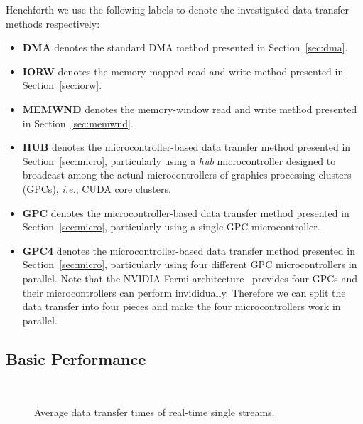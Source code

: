 Henchforth we use the following labels to denote the investigated data
transfer methods respectively:
\begin{itemize}
 \item \textbf{DMA} denotes the standard DMA method presented in
       Section~\ref{sec:dma}.
 \item \textbf{IORW} denotes the memory-mapped read and write method
       presented in Section~\ref{sec:iorw}.
 \item \textbf{MEMWND} denotes the memory-window read and write method
       presented in Section~\ref{sec:memwnd}.
 \item \textbf{HUB} denotes the microcontroller-based data transfer
       method presented in Section~\ref{sec:micro}, particularly using a
       \textit{hub} microcontroller designed to broadcast among the
       actual microcontrollers of graphics processing clusters (GPCs),
       \textit{i.e.}, CUDA core clusters.
 \item \textbf{GPC} denotes the microcontroller-based data transfer
       method presented in Section~\ref{sec:micro}, particularly using a
       single GPC microcontroller.
 \item \textbf{GPC4} denotes the microcontroller-based data transfer
       method presented in Section~\ref{sec:micro}, particularly using
       four different GPC microcontrollers in parallel.
       Note that the NVIDIA Fermi architecture~\cite{NVIDIA_Fermi}
       provides four GPCs and their microcontrollers can perform
       invididually.
       Therefore we can split the data transfer into four pieces and
       make the four microcontrollers work in parallel.
\end{itemize}

\subsection{Basic Performance}

\begin{figure}[!t]
 \centering
 \\
 \caption{Average data transfer times of real-time single streams.}
 \label{fig:average_transfer_real-time}
\end{figure}

